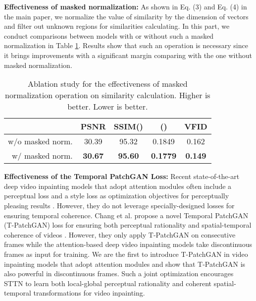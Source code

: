 \documentclass[runningheads]{llncs}
\begin{document}
\textbf{Effectiveness of masked normalization:} 
As shown in Eq. (3) and Eq. (4) in the main paper, we normalize the value of similarity by the dimension of vectors and filter out unknown regions for similarities calculating. 
In this part, we conduct comparisons between models with or without such a masked normalization in Table \ref{tb:ab-norm}. Results show that such an operation is necessary since it brings improvements with a significant margin comparing with the one without masked normalization.  
\begin{table}
   \begin{center}
   \begin{tabular}{r|c|c|c|c} 
    &PSNR &SSIM() & () &VFID \\\hline \hline
    w/o masked norm.  &30.39 &95.32 &0.1849 &0.162 \\\hline 
    w/ masked norm. &\textbf{30.67} &\textbf{95.60} &\textbf{0.1779} &\textbf{0.149} \\\hline 
   \end{tabular} 
\end{center}
   \caption{Ablation study for the effectiveness of masked normalization operation on similarity calculation.  Higher is better.  Lower is better. }
   \label{tb:ab-norm}
\end{table}






\textbf{Effectiveness of the Temporal PatchGAN Loss:}
Recent state-of-the-art deep video inpainting models that adopt attention modules often include a perceptual loss \cite{johnson2016perceptual}  and a style loss \cite{gatys2016image} as optimization objectives for perceptually pleasing results \cite{lee2019copy,oh2019onion}. However, they do not leverage specially-designed losses for ensuring temporal coherence. 
Chang et al. propose a novel Temporal PatchGAN (T-PatchGAN) loss for ensuring both perceptual rationality and spatial-temporal coherence of videos \cite{chang2019free,chang2019learnable}. However, they only apply T-PatchGAN on consecutive frames while the attention-based deep video inpainting models take discontinuous frames as input for training. 
We are the first to introduce T-PatchGAN in video inpainting models that adopt attention modules and show that T-PatchGAN is also powerful in discontinuous frames. Such a joint optimization encourages STTN to learn both local-global perceptual rationality and coherent spatial-temporal transformations for video inpainting. 
\end{document}
